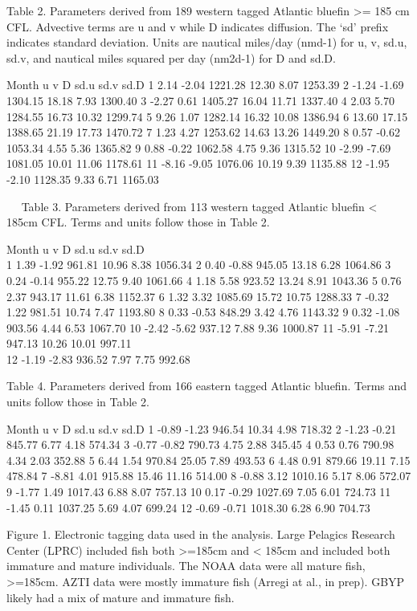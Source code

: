 \documentclass[
  authoryear,
  preprint,
  5p,
  onecolumn]{elsarticle}
\begin{document}
Table 2. Parameters derived from 189 western tagged Atlantic bluefin
\textgreater= 185 cm CFL. Advective terms are u and v while D indicates
diffusion. The `sd' prefix indicates standard deviation. Units are
nautical miles/day (nmd-1) for u, v, sd.u, sd.v, and nautical miles
squared per day (nm2d-1) for D and sd.D.

Month u v D sd.u sd.v sd.D 1 2.14 -2.04 1221.28 12.30 8.07 1253.39 2
-1.24 -1.69 1304.15 18.18 7.93 1300.40 3 -2.27 0.61 1405.27 16.04 11.71
1337.40 4 2.03 5.70 1284.55 16.73 10.32 1299.74 5 9.26 1.07 1282.14
16.32 10.08 1386.94 6 13.60 17.15 1388.65 21.19 17.73 1470.72 7 1.23
4.27 1253.62 14.63 13.26 1449.20 8 0.57 -0.62 1053.34 4.55 5.36 1365.82
9 0.88 -0.22 1062.58 4.75 9.36 1315.52 10 -2.99 -7.69 1081.05 10.01
11.06 1178.61 11 -8.16 -9.05 1076.06 10.19 9.39 1135.88 12 -1.95 -2.10
1128.35 9.33 6.71 1165.03

  Table 3. Parameters derived from 113 western tagged Atlantic bluefin
\textless{} 185cm CFL. Terms and units follow those in Table 2.

Month u v D sd.u sd.v sd.D\\
1 1.39 -1.92 961.81 10.96 8.38 1056.34 2 0.40 -0.88 945.05 13.18 6.28
1064.86 3 0.24 -0.14 955.22 12.75 9.40 1061.66 4 1.18 5.58 923.52 13.24
8.91 1043.36 5 0.76 2.37 943.17 11.61 6.38 1152.37 6 1.32 3.32 1085.69
15.72 10.75 1288.33 7 -0.32 1.22 981.51 10.74 7.47 1193.80 8 0.33 -0.53
848.29 3.42 4.76 1143.32 9 0.32 -1.08 903.56 4.44 6.53 1067.70 10 -2.42
-5.62 937.12 7.88 9.36 1000.87 11 -5.91 -7.21 947.13 10.26 10.01
997.11\\
12 -1.19 -2.83 936.52 7.97 7.75 992.68

Table 4. Parameters derived from 166 eastern tagged Atlantic bluefin.
Terms and units follow those in Table 2.

Month u v D sd.u sd.v sd.D 1 -0.89 -1.23 946.54 10.34 4.98 718.32 2
-1.23 -0.21 845.77 6.77 4.18 574.34 3 -0.77 -0.82 790.73 4.75 2.88
345.45 4 0.53 0.76 790.98 4.34 2.03 352.88 5 6.44 1.54 970.84 25.05 7.89
493.53 6 4.48 0.91 879.66 19.11 7.15 478.84 7 -8.81 4.01 915.88 15.46
11.16 514.00 8 -0.88 3.12 1010.16 5.17 8.06 572.07 9 -1.77 1.49 1017.43
6.88 8.07 757.13 10 0.17 -0.29 1027.69 7.05 6.01 724.73 11 -1.45 0.11
1037.25 5.69 4.07 699.24 12 -0.69 -0.71 1018.30 6.28 6.90 704.73

Figure 1. Electronic tagging data used in the analysis. Large Pelagics
Research Center (LPRC) included fish both \textgreater=185cm and
\textless{} 185cm and included both immature and mature individuals. The
NOAA data were all mature fish, \textgreater=185cm. AZTI data were
mostly immature fish (Arregi at al., in prep). GBYP likely had a mix of
mature and immature fish.
\end{document}
